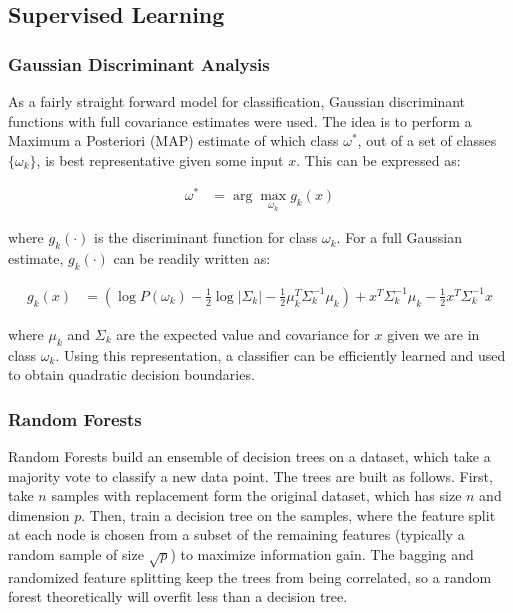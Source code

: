 \documentclass{article}[12pt]
\begin{document}
   \subsection{Supervised Learning}
   \subsubsection{Gaussian Discriminant Analysis}
   As a fairly straight forward model for classification, Gaussian discriminant functions with full covariance estimates were used. The idea is to perform a Maximum a Posteriori (MAP) estimate of which class $\omega^*$, out of a set of classes $\lbrace \omega_k \rbrace$, is best representative given some input $x$. This can be expressed as:
   
   \begin{align*}
   \omega^* &= \arg \max_{\omega_k} g_k(x)
   \end{align*}
   
   where $g_k(\cdot)$ is the discriminant function for class $\omega_k$. For a full Gaussian estimate, $g_k(\cdot)$ can be readily written as:
   
   \begin{align*}
   g_k(x) &= \left( \log P(\omega_k) - \frac{1}{2} \log \left| \Sigma_k \right| - \frac{1}{2} \mu_k^T \Sigma_k^{-1} \mu_k \right) + x^T \Sigma_k^{-1} \mu_k - \frac{1}{2} x^T \Sigma_k^{-1} x 
   \end{align*}
   
   where $\mu_k$ and $\Sigma_k$ are the expected value and covariance for $x$ given we are in class $\omega_k$. Using this representation, a classifier can be efficiently learned and used to obtain quadratic decision boundaries.
   
   
   \subsubsection{Random Forests}
   Random Forests build an ensemble of decision trees on a dataset, which take a majority vote to classify a new data point. The trees are built as follows.  First, take $n$ samples with replacement form the original dataset, which has size $n$ and dimension $p$.  Then, train a decision tree on the samples, where the feature split at each node is chosen from a subset of the remaining features (typically a random sample of size $\sqrt{p}$) to maximize information gain.  The bagging and randomized feature splitting keep the trees from being correlated, so a random forest theoretically will overfit less than a decision tree.
   
\end{document}
